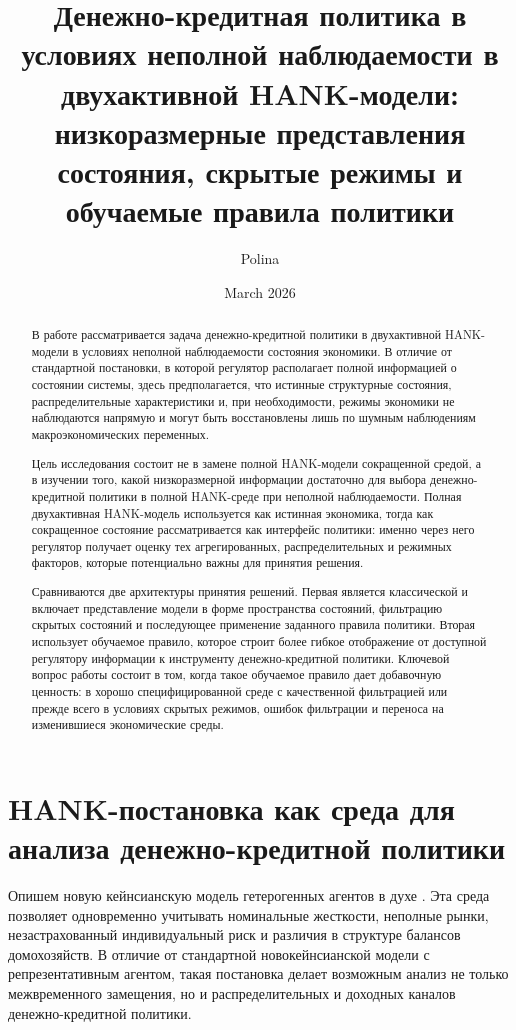 \documentclass[12pt,a4paper]{article}
\title{Денежно-кредитная политика в условиях неполной наблюдаемости в двухактивной HANK-модели: низкоразмерные представления состояния, скрытые режимы и обучаемые правила политики}
\author{Polina}
\date{March 2026}
\begin{document}
\maketitle
\thispagestyle{plain}

\begin{abstract}
В работе рассматривается задача денежно-кредитной политики в двухактивной HANK-модели в условиях неполной наблюдаемости состояния экономики. В отличие от стандартной постановки, в которой регулятор располагает полной информацией о состоянии системы, здесь предполагается, что истинные структурные состояния, распределительные характеристики и, при необходимости, режимы экономики не наблюдаются напрямую и могут быть восстановлены лишь по шумным наблюдениям макроэкономических переменных.

Цель исследования состоит не в замене полной HANK-модели сокращенной средой, а в изучении того, какой низкоразмерной информации достаточно для выбора денежно-кредитной политики в полной HANK-среде при неполной наблюдаемости. Полная двухактивная HANK-модель используется как истинная экономика, тогда как сокращенное состояние рассматривается как интерфейс политики: именно через него регулятор получает оценку тех агрегированных, распределительных и режимных факторов, которые потенциально важны для принятия решения.

Сравниваются две архитектуры принятия решений. Первая является классической и включает представление модели в форме пространства состояний, фильтрацию скрытых состояний и последующее применение заданного правила политики. Вторая использует обучаемое правило, которое строит более гибкое отображение от доступной регулятору информации к инструменту денежно-кредитной политики. Ключевой вопрос работы состоит в том, когда такое обучаемое правило дает добавочную ценность: в хорошо специфицированной среде с качественной фильтрацией или прежде всего в условиях скрытых режимов, ошибок фильтрации и переноса на изменившиеся экономические среды.
\end{abstract}

\section{HANK-постановка как среда для анализа денежно-кредитной политики}

Опишем новую кейнсианскую модель гетерогенных агентов в духе \cite{KaplanMollViolante2018}. Эта среда позволяет одновременно учитывать номинальные жесткости, неполные рынки, незастрахованный индивидуальный риск и различия в структуре балансов домохозяйств. В отличие от стандартной новокейнсианской модели с репрезентативным агентом, такая постановка делает возможным анализ не только межвременного замещения, но и распределительных и доходных каналов денежно-кредитной политики.
\end{document}
